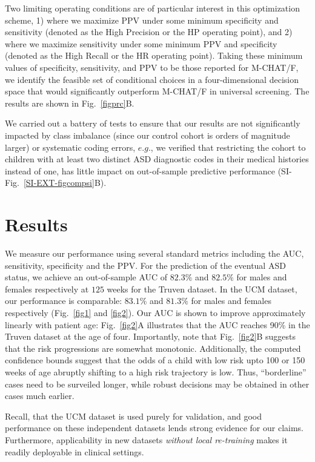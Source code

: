 \documentclass[onecolumn,10pt]{IEEEtran}
\begin{document}
Two limiting operating conditions are  of particular interest in this optimization scheme, 1) where we maximize PPV under some minimum specificity and sensitivity (denoted as  the High Precision or the HP operating point), and 2) where we maximize sensitivity under some minimum PPV and specificity (denoted as the High Recall or the HR  operating point). Taking these minimum values of specificity, sensitivity, and PPV to be those reported for  M-CHAT/F, we identify the feasible set of conditional choices in a four-dimensional decision space  that would  significantly outperform M-CHAT/F in universal screening. The results are shown in Fig.~\ref{figprc}B.

We carried out a battery of tests to ensure that our results are not significantly impacted by class imbalance (since our control cohort is orders of magnitude larger) or systematic coding errors, $e.g.$, we verified that restricting the \treatment cohort to children with at least two  distinct ASD diagnostic codes in their medical histories instead of one, has little impact on  out-of-sample predictive performance (SI-Fig.~\ref{SI-EXT-figcompsi}B). 

\section*{Results}
We measure our performance using several standard metrics including the AUC, sensitivity, specificity and the PPV. For the prediction of the eventual ASD  status, we achieve an out-of-sample AUC of $82.3\%$ and  $82.5\%$ for males and females respectively at $125$ weeks for the Truven dataset. In the UCM dataset, our performance is comparable: $83.1\%$ and $81.3\%$ for males and females respectively (Fig.~\ref{fig1} and \ref{fig2}).  Our AUC is shown to improve approximately  linearly  with patient age: Fig.~\ref{fig2}A illustrates that the  AUC  reaches 90\%  in the Truven dataset at the age of four. Importantly, note that Fig.~\ref{fig2}B suggests that the risk progressions are somewhat monotonic. Additionally, the computed confidence bounds suggest that the odds of a child with low risk upto 100 or 150 weeks of age abruptly shifting to a high risk trajectory is low. Thus,  ``borderline'' cases need to be surveiled longer, while robust decisions may be obtained in other cases much earlier.

Recall, that the UCM dataset is used purely for validation, and good  performance on these independent datasets lends strong evidence for our claims. Furthermore, applicability in new datasets \textit{without local re-training} makes it readily  deployable in clinical settings.
\end{document}

